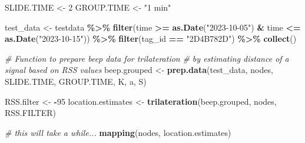 \documentclass[
]{book}
\newenvironment{Shaded}{\begin{snugshade}}{\end{snugshade}}
\newcommand{\CommentTok}[1]{\textcolor[rgb]{0.56,0.35,0.01}{\textit{#1}}}
\newcommand{\DecValTok}[1]{\textcolor[rgb]{0.00,0.00,0.81}{#1}}
\newcommand{\FunctionTok}[1]{\textcolor[rgb]{0.13,0.29,0.53}{\textbf{#1}}}
\newcommand{\NormalTok}[1]{#1}
\newcommand{\OtherTok}[1]{\textcolor[rgb]{0.56,0.35,0.01}{#1}}
\newcommand{\SpecialCharTok}[1]{\textcolor[rgb]{0.81,0.36,0.00}{\textbf{#1}}}
\newcommand{\StringTok}[1]{\textcolor[rgb]{0.31,0.60,0.02}{#1}}
\begin{document}
\begin{Shaded}
\begin{Highlighting}[]
\NormalTok{SLIDE.TIME }\OtherTok{\textless{}{-}} \DecValTok{2}
\NormalTok{GROUP.TIME }\OtherTok{\textless{}{-}} \StringTok{"1 min"}

\NormalTok{test\_data }\OtherTok{\textless{}{-}}\NormalTok{ testdata }\SpecialCharTok{\%\textgreater{}\%}
  \FunctionTok{filter}\NormalTok{(time }\SpecialCharTok{\textgreater{}=} \FunctionTok{as.Date}\NormalTok{(}\StringTok{"2023{-}10{-}05"}\NormalTok{) }\SpecialCharTok{\&}\NormalTok{ time }\SpecialCharTok{\textless{}=} \FunctionTok{as.Date}\NormalTok{(}\StringTok{"2023{-}10{-}15"}\NormalTok{)) }\SpecialCharTok{\%\textgreater{}\%}
  \FunctionTok{filter}\NormalTok{(tag\_id }\SpecialCharTok{==} \StringTok{"2D4B782D"}\NormalTok{) }\SpecialCharTok{\%\textgreater{}\%}
  \FunctionTok{collect}\NormalTok{()}

\CommentTok{\# Function to prepare beep data for trilateration }
\CommentTok{\# by estimating distance of a signal based on RSS values}
\NormalTok{beep.grouped }\OtherTok{\textless{}{-}} \FunctionTok{prep.data}\NormalTok{(test\_data,}
\NormalTok{                          nodes,}
\NormalTok{                          SLIDE.TIME,}
\NormalTok{                          GROUP.TIME,}
\NormalTok{                          K, }
\NormalTok{                          a, }
\NormalTok{                          S) }

\NormalTok{RSS.filter }\OtherTok{\textless{}{-}} \SpecialCharTok{{-}}\DecValTok{95}
\NormalTok{location.estimates }\OtherTok{\textless{}{-}} \FunctionTok{trilateration}\NormalTok{(beep.grouped, nodes, RSS.FILTER)}

\CommentTok{\# this will take a while...}
\FunctionTok{mapping}\NormalTok{(nodes, location.estimates)}
\end{Highlighting}
\end{Shaded}


  
\end{document}
